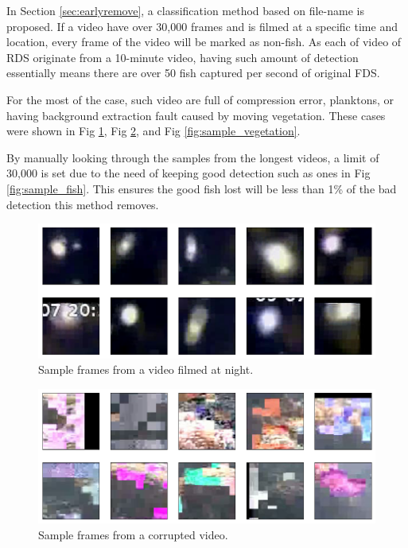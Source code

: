 \documentclass[bsc,logo,twoside,fullspacing,parskip]{infthesis}
\begin{document}
\begin{appendices}
In Section \ref{sec:earlyremove}, a classification method based on file-name is proposed.
If a video have over 30,000 frames and is filmed at a specific time and location, every frame of the video will be marked as non-fish. 
As each of video of RDS originate from a 10-minute video, having such amount of detection essentially means there are over 50 fish captured per second of original FDS.

For the most of the case, such video are full of compression error, planktons, or having background extraction fault caused by moving vegetation. These cases were shown in Fig \ref{fig:sample_night}, Fig \ref{fig:sample_corrupt}, and Fig \ref{fig:sample_vegetation}.

By manually looking through the samples from the longest videos, a limit of 30,000 is set due to the need of keeping good detection such as ones in Fig \ref{fig:sample_fish}. This ensures the good fish lost will be less than 1\% of the bad detection this method removes.

\begin{figure}
\centering
    \includegraphics[scale=0.46]{graph/sample_night.png}
    \caption{Sample frames from a video filmed at night.}
    \label{fig:sample_night}
\end{figure}

\begin{figure}
\centering
    \includegraphics[scale=0.46]{graph/sample_corrupt.png}
    \caption{Sample frames from a corrupted video.}
    \label{fig:sample_corrupt}
\end{figure}


\end{appendices}
\end{document}
